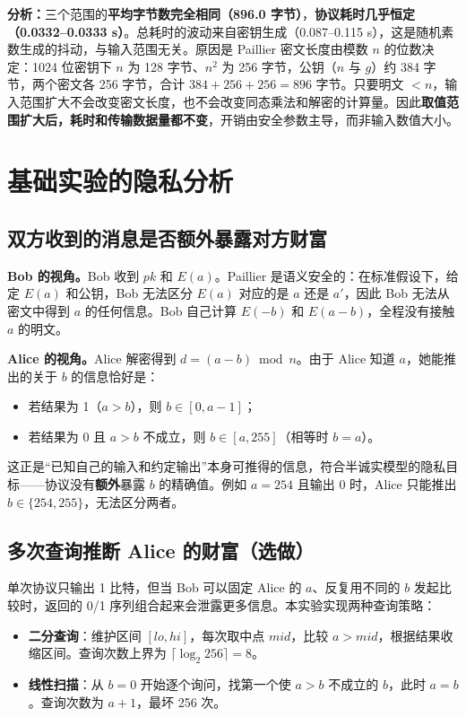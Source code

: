 \documentclass{SYSUReport}
\begin{document}
\textbf{分析：}三个范围的\textbf{平均字节数完全相同（896.0 字节）}，\textbf{协议耗时几乎恒定（0.0332--0.0333 s）}。总耗时的波动来自密钥生成（0.087--0.115 s），这是随机素数生成的抖动，与输入范围无关。原因是 Paillier 密文长度由模数 $n$ 的位数决定：1024 位密钥下 $n$ 为 128 字节、$n^2$ 为 256 字节，公钥（$n$ 与 $g$）约 384 字节，两个密文各 256 字节，合计 $384+256+256=896$ 字节。只要明文 $<n$，输入范围扩大不会改变密文长度，也不会改变同态乘法和解密的计算量。因此\textbf{取值范围扩大后，耗时和传输数据量都不变}，开销由安全参数主导，而非输入数值大小。

\section{基础实验的隐私分析}

\subsection{双方收到的消息是否额外暴露对方财富}

\textbf{Bob 的视角。}Bob 收到 $pk$ 和 $E(a)$。Paillier 是语义安全的：在标准假设下，给定 $E(a)$ 和公钥，Bob 无法区分 $E(a)$ 对应的是 $a$ 还是 $a'$，因此 Bob 无法从密文中得到 $a$ 的任何信息。Bob 自己计算 $E(-b)$ 和 $E(a-b)$，全程没有接触 $a$ 的明文。

\textbf{Alice 的视角。}Alice 解密得到 $d=(a-b)\bmod n$。由于 Alice 知道 $a$，她能推出的关于 $b$ 的信息恰好是：
\begin{itemize}
  \item 若结果为 1（$a>b$），则 $b\in[0,a-1]$；
  \item 若结果为 0 且 $a>b$ 不成立，则 $b\in[a,255]$（相等时 $b=a$）。
\end{itemize}
这正是“已知自己的输入和约定输出”本身可推得的信息，符合半诚实模型的隐私目标——协议没有\textbf{额外}暴露 $b$ 的精确值。例如 $a=254$ 且输出 0 时，Alice 只能推出 $b\in\{254,255\}$，无法区分两者。

\subsection{多次查询推断 Alice 的财富（选做）}
\label{sec:query}

单次协议只输出 1 比特，但当 Bob 可以固定 Alice 的 $a$、反复用不同的 $b$ 发起比较时，返回的 0/1 序列组合起来会泄露更多信息。本实验实现两种查询策略：

\begin{itemize}
  \item \textbf{二分查询}：维护区间 $[lo,hi]$，每次取中点 $mid$，比较 $a>mid$，根据结果收缩区间。查询次数上界为 $\lceil\log_2 256\rceil=8$。
  \item \textbf{线性扫描}：从 $b=0$ 开始逐个询问，找第一个使 $a>b$ 不成立的 $b$，此时 $a=b$。查询次数为 $a+1$，最坏 256 次。
\end{itemize}
\end{document}
